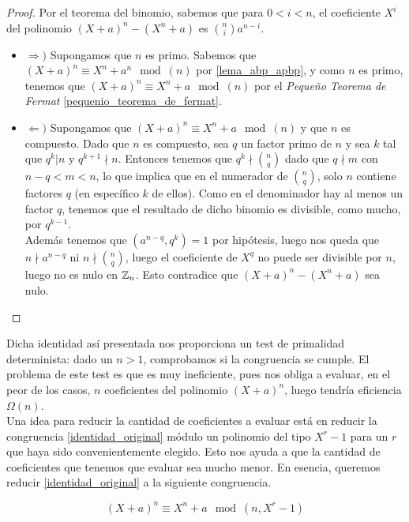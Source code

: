 \begin{proof}
	Por el teorema del binomio, sabemos que para $0 < i < n$, el coeficiente $X^i$ del polinomio $(X + a)^n - (X^n + a)$ es $\binom{n}{i}a^{n-i}$.
	
	\begin{itemize}
		\item $\Rightarrow)$ Supongamos que $n$ es primo. Sabemos que $(X + a)^n \equiv X^n + a^n \mod(n)$ por \autoref{lema_abp_apbp}, y como $n$ es primo,  tenemos que $(X + a)^n \equiv X^n + a \mod(n)$ por el \textit{Pequeño Teorema de Fermat} \ref{pequenio_teorema_de_fermat}.
		
		\item $\Leftarrow)$ Supongamos que $(X + a)^n \equiv X^n + a \mod(n)$ y que $n$ es compuesto. Dado que $n$ es compuesto, sea $q$ un factor primo de $n$ y sea $k$ tal que $q^k | n$ y $q^{k+1} \nmid n$. Entonces tenemos que $q^k \nmid \binom{n}{q}$ dado que $q \nmid m$ con $n - q < m < n$, lo que implica que en el numerador de $\binom{n}{q}$, solo $n$ contiene factores $q$ (en específico $k$ de ellos). Como en el denominador hay al menos un factor $q$, tenemos que el resultado de dicho binomio es divisible, como mucho, por $q^{k-1}$.\\
		
		Además tenemos que $(a^{n-q}, q^k) = 1$ por hipótesis, luego nos queda que $n \nmid a^{n-q}$ ni $n \nmid \binom{n}{q}$, luego el coeficiente de $X^q$ no puede ser divisible por $n$, luego no es nulo en $\mathbb{Z}_n$. Esto contradice que $(X + a)^n - (X^n + a)$ sea nulo.
	\end{itemize}
\end{proof}

Dicha identidad así presentada nos proporciona un test de primalidad determinista: dado un $n > 1$, comprobamos si la congruencia se cumple. El problema de este test es que es muy ineficiente, pues nos obliga a evaluar, en el peor de los casos, $n$ coeficientes del polinomio $(X + a)^n$, luego tendría eficiencia $\Omega(n)$.\\

Una idea para reducir la cantidad de coeficientes a evaluar está en reducir la congruencia \eqref{identidad_original} módulo un polinomio del tipo $X^r - 1$ para un $r$ que haya sido convenientemente elegido. Esto nos ayuda a que la cantidad de coeficientes que tenemos que evaluar sea mucho menor. En esencia, queremos reducir \eqref{identidad_original} a la siguiente congruencia.

\begin{equation}\label{identidad_con_polinomio}
(X + a)^n \equiv X^n + a \mod(n, X^r - 1)
\end{equation}

